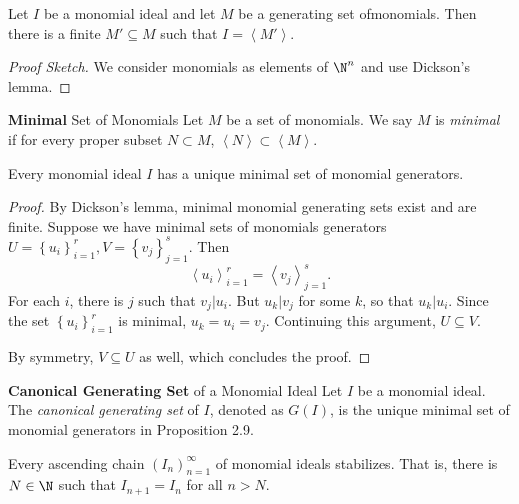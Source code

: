 \documentclass[co439]{subfiles}
\begin{document}
    \begin{cor}{}
        Let $I$ be a monomial ideal and let $M$ be a generating set ofmonomials. Then there is a finite $M'\subseteq M$ such that $I = \left< M' \right>$. 
    \end{cor}	

    \begin{proof}[Proof Sketch]
        We consider monomials as elements of $\N^n$ and use Dickson's lemma.
    \end{proof}
    
    \begin{definition}{\textbf{Minimal} Set of Monomials}
        Let $M$ be a set of monomials. We say $M$ is \emph{minimal} if for every proper subset $N\subset M$, $\left< N \right> \subset \left< M \right> $.   
    \end{definition}
    
    \begin{prop}{}
        Every monomial ideal $I$ has a unique minimal set of monomial generators.
    \end{prop}
    
    \begin{proof}
        By Dickson's lemma, minimal monomial generating sets exist and are finite. Suppose we have minimal sets of monomials generators $U = \left\lbrace u_i \right\rbrace^{r}_{i=1}, V = \left\lbrace v_j \right\rbrace^{s}_{j=1}$. Then
        \begin{equation*}
            \left< u_i \right>^r_{i=1}  = \left< v_j \right>^s_{j=1}. 
        \end{equation*} 
        For each $i$, there is $j$ such that $v_{j}|u_i$. But $u_k|v_{j}$ for some $k$, so that $u_k|u_i$. Since the set $\left\lbrace u_i \right\rbrace^{r}_{i=1}$ is minimal, $u_k = u_i = v_j$. Continuing this argument, $U\subseteq V$. 

        By symmetry, $V\subseteq U$ as well, which concludes the proof.
    \end{proof}
    
    \begin{definition}{\textbf{Canonical Generating Set} of a Monomial Ideal}
        Let $I$ be a monomial ideal. The \emph{canonical generating set} of $I$, denoted as $G\left( I \right)$, is the unique minimal set of monomial generators in Proposition 2.9.
    \end{definition}

    \begin{prop}{}
        Every ascending chain $\left( I_{n} \right)^{\infty}_{n=1}$ of monomial ideals stabilizes. That is, there is $N\in\N$ such that $I_{n+1} = I_n$ for all $n>N$.
    \end{prop}
\end{document}
